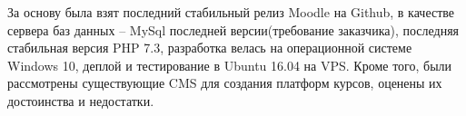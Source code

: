 \documentclass[a4paper,14pt]{article}
\begin{document}
За основу была взят последний стабильный релиз Moodle на Github, в качестве сервера баз данных -- MySql последней версии(требование заказчика), последняя стабильная версия PHP 7.3, разработка велась на операционной системе Windows 10, деплой и тестирование в Ubuntu 16.04 на VPS. 
Кроме того, были рассмотрены существующие CMS для создания платформ курсов, оценены их достоинства и недостатки.























\end{document}
